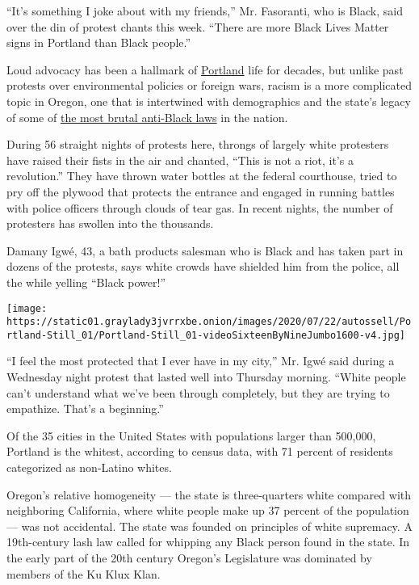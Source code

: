 ``It's something I joke about with my friends,'' Mr. Fasoranti, who is
Black, said over the din of protest chants this week. ``There are more
Black Lives Matter signs in Portland than Black people.''

Loud advocacy has been a hallmark of
\href{https://www.nytimes3xbfgragh.onion/2020/07/25/us/a-wall-of-vets-joins-the-front-lines-of-portland-protests.html}{Portland}
life for decades, but unlike past protests over environmental policies
or foreign wars, racism is a more complicated topic in Oregon, one that
is intertwined with demographics and the state's legacy of some of
\href{https://www.nytimes3xbfgragh.onion/2017/06/04/us/portland-killings-racist-laws-oregon.html}{the
most brutal anti-Black laws} in the nation.

During 56 straight nights of protests here, throngs of largely white
protesters have raised their fists in the air and chanted, ``This is not
a riot, it's a revolution.'' They have thrown water bottles at the
federal courthouse, tried to pry off the plywood that protects the
entrance and engaged in running battles with police officers through
clouds of tear gas. In recent nights, the number of protesters has
swollen into the thousands.

Damany Igwé, 43, a bath products salesman who is Black and has taken
part in dozens of the protests, says white crowds have shielded him from
the police, all the while yelling ``Black power!''

\texttt{[image: https://static01.graylady3jvrrxbe.onion/images/2020/07/22/autossell/Portland-Still\_01/Portland-Still\_01-videoSixteenByNineJumbo1600-v4.jpg]}

``I feel the most protected that I ever have in my city,'' Mr. Igwé said
during a Wednesday night protest that lasted well into Thursday morning.
``White people can't understand what we've been through completely, but
they are trying to empathize. That's a beginning.''

Of the 35 cities in the United States with populations larger than
500,000, Portland is the whitest, according to census data, with 71
percent of residents categorized as non-Latino whites.

Oregon's relative homogeneity --- the state is three-quarters white
compared with neighboring California, where white people make up 37
percent of the population --- was not accidental. The state was founded
on principles of white supremacy. A 19th-century lash law called for
whipping any Black person found in the state. In the early part of the
20th century Oregon's Legislature was dominated by members of the Ku
Klux Klan.

